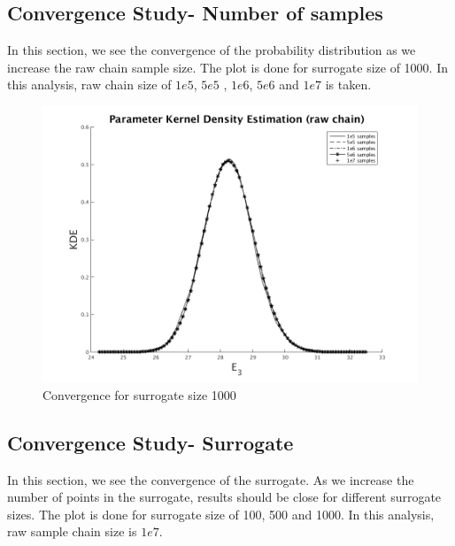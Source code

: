 \subsection{Convergence Study- Number of samples }

 In this section, we see the convergence of the probability distribution as we increase the raw chain sample size. The plot is done for surrogate size of 1000. In this analysis, raw chain size of $1e5$, $5e5$ , $1e6$, $5e6$ and $1e7$ is taken.

\begin{figure}[H]
\centering
\includegraphics[scale = 0.7]{model_1/sample_conv}
    \caption{Convergence for surrogate size 1000}
\end{figure}


\subsection{Convergence Study- Surrogate }

 In this section, we see the convergence of the surrogate. As we increase the number of points in the surrogate, results should be close for different surrogate sizes. The plot is done for surrogate size of 100, 500 and 1000. In this analysis, raw sample chain size is $1e7$.


